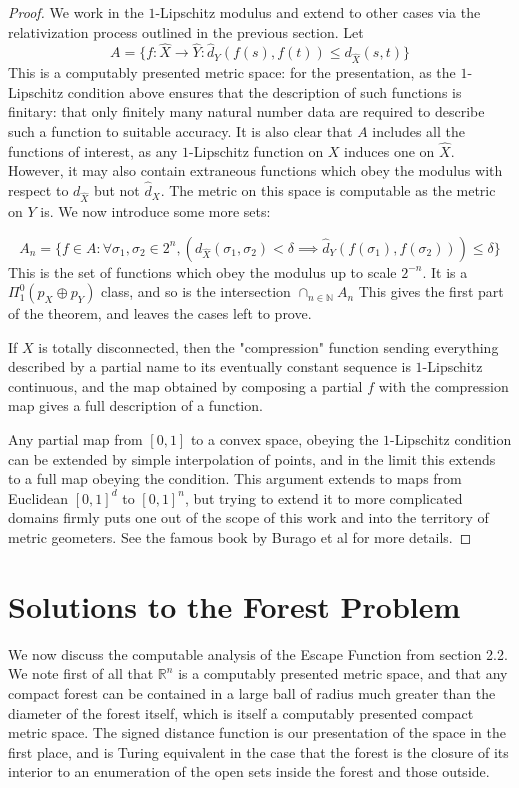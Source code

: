 \documentclass[10pt,a4paper]{article}
\theoremstyle{definition}
\newcommand{\N}{\mathbb{N}}
\def\R{\mathbb{R}}
\begin{document}
\begin{proof}
We work in the $1$-Lipschitz modulus and extend to other cases via the relativization process outlined in the previous section. Let 
$$A = \{f:\hat{X}\rightarrow \hat{Y}:  \hat{d}_{Y}(f(s),f(t)) \leq d_{\hat{X}}(s,t)\} $$
This is a computably presented metric space: for the presentation, as the $1$-Lipschitz condition above ensures that the description of such functions is finitary: that only finitely many natural number data are required to describe such a function to suitable accuracy. It is also clear that $A$ includes all the functions of interest, as any $1$-Lipschitz function on $X$ induces one on $\hat{X}$. However, it may also contain extraneous functions which obey the modulus with respect to $d_{\hat{X}}$ but not $\hat{d}_X$. The metric on this space is computable as the metric on $Y$ is. We now introduce some more sets:

$$A_n = \{f\in A: \forall \sigma_1,\sigma_2\in 2^n, (d_{\hat{X}}(\sigma_1,\sigma_2) < \delta \implies \hat{d}_Y(f(\sigma_1), f(\sigma_2))) \leq\delta\}$$
This is the set of functions which obey the modulus up to scale $2^{-n}$. It is a $\Pi^0_1(p_X\oplus p_Y)$ class, and so is the intersection $\cap_{n\in\N} A_n$ This gives the first part of the theorem, and leaves the cases left to prove.

If $X$ is totally disconnected, then the "compression" function sending everything described by a partial name to its eventually constant sequence is $1$-Lipschitz continuous, and the map obtained by composing a partial $f$ with the compression map gives a full description of a function.

Any partial map from $[0,1]$ to a convex space, obeying the $1$-Lipschitz condition can be extended by simple interpolation of points, and in the limit this extends to a full map obeying the condition. This argument extends to maps from Euclidean $[0,1]^d$ to $[0,1]^n$, but trying to extend it to more complicated domains firmly puts one out of the scope of this work and into the territory of metric geometers. See the famous book by Burago et al \cite{bbi} for more details.
\end{proof}


\section{Solutions to the Forest Problem}
\label{sec:four}
We now discuss the computable analysis of the Escape Function from section 2.2. We note first of all that $\R^n$ is a computably presented metric space, and that any compact forest can be contained in a large ball of radius much greater than the diameter of the forest itself, which is itself a computably presented compact metric space. The signed distance function is our presentation of the space in the first place, and is Turing equivalent in the case that the forest is the closure of its interior to an enumeration of the open sets inside the forest and those outside.
\end{document}
